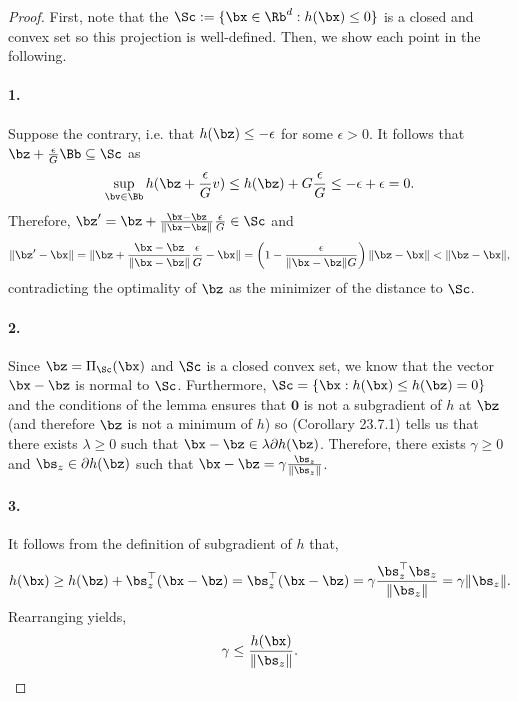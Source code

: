 \begin{proof}
    First, note that the $\Sc := \{ \bx \in \Rb^d : h( \bx) \leq 0 \}$ is a closed and convex set so this projection is well-defined.
    Then, we show each point in the following.

    \paragraph{1.}
    Suppose the contrary, i.e. that $h( \bz) \leq -\epsilon$ for some $\epsilon > 0$.
    It follows that $\bz + \frac{\epsilon}{G} \Bb \subseteq \Sc$ as
    \begin{equation*}
        \sup_{\bv \in \Bb} h(\bz + \frac{\epsilon}{G} v) \leq  h(\bz) +  G \frac{\epsilon}{G} \leq -\epsilon + \epsilon = 0.
    \end{equation*}
    Therefore, $\bz' = \bz + \frac{\bx - \bz}{\| \bx - \bz \|} \frac{\epsilon}{G} \in \Sc$ and
    \begin{equation*}
        \| \bz' - \bx \| = \| \bz + \frac{\bx - \bz}{\| \bx - \bz \|} \frac{\epsilon}{G} - \bx \| = \left( 1 - \frac{\epsilon}{\| \bx - \bz \| G} \right) \| \bz - \bx \| < \| \bz - \bx \|,
    \end{equation*} 
    contradicting the optimality of $\bz$ as the minimizer of the distance to $\Sc$.

    \paragraph{2.}
    Since $\bz = \Pi_{\Sc} (\bx)$ and $\Sc$ is a closed convex set, we know that the vector $\bx - \bz$ is normal to $\Sc$.
    Furthermore, $\Sc = \{ \bx : h(\bx) \leq h(\bz) = 0 \}$ and the conditions of the lemma ensures that $\mathbf{0}$ is not a subgradient of $h$ at $\bz$ (and therefore $\bz$ is not a minimum of $h$) so \cite{rockafellar1970convex} (Corollary 23.7.1) tells us that there exists $\lambda \geq 0$ such that $\bx - \bz \in \lambda \partial h(\bz)$.
    Therefore, there exists $\gamma \geq 0$ and $\bs_z \in \partial h(\bz)$ such that $\bx - \bz = \gamma \frac{\bs_z}{\| \bs_z \|}$.

    \paragraph{3.}
    It follows from the definition of subgradient of $h$ that,
    \begin{equation*}
        h (\bx) \geq h(\bz) + \bs_z^\top(\bx - \bz) = \bs_z^\top(\bx - \bz) = \gamma \frac{\bs_z^\top \bs_z}{\| \bs_z \|} = \gamma \| \bs_z \|.
    \end{equation*}
    Rearranging yields,
    \begin{equation*}
        \gamma \leq \frac{h (\bx)}{\| \bs_z \|}.
    \end{equation*}


\end{proof}
